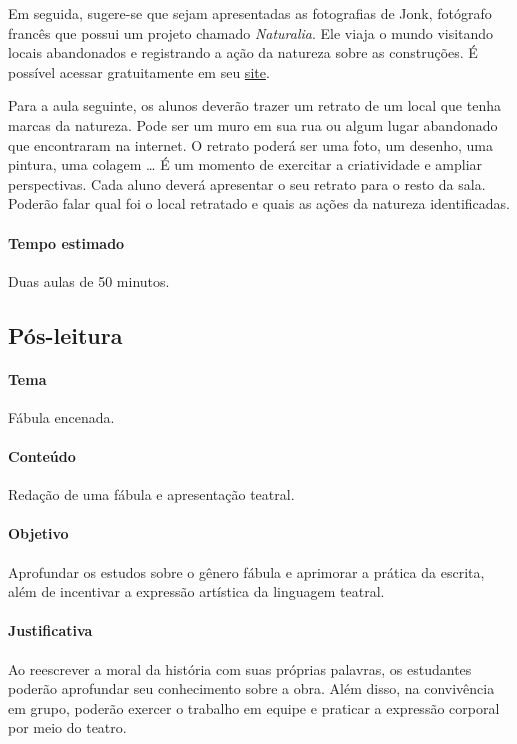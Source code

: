 \documentclass[11pt]{extarticle}
\begin{document}
Em seguida, sugere-se que sejam apresentadas as fotografias de Jonk, fotógrafo francês que possui um projeto chamado \textit{Naturalia}. Ele viaja o mundo visitando locais abandonados e registrando a ação da natureza sobre as construções. É possível acessar gratuitamente em seu \href{https://www.jonk-photography.com/en/naturalia/}{site}.

Para a aula seguinte, os alunos deverão trazer um retrato de um local que tenha marcas da natureza. Pode ser um muro em sua rua ou algum lugar abandonado que encontraram na internet. O retrato poderá ser uma foto, um desenho, uma pintura, uma colagem \ldots{} É um momento de exercitar a criatividade e ampliar perspectivas. Cada aluno deverá apresentar o seu retrato para o resto da sala. Poderão falar qual foi o local retratado e quais as ações da natureza identificadas.

\paragraph{Tempo estimado} Duas aulas de 50 minutos.

\subsection{Pós-leitura}


\paragraph{Tema} Fábula encenada.

\paragraph{Conteúdo} Redação de uma fábula e apresentação teatral.

\paragraph{Objetivo} Aprofundar os estudos sobre o gênero fábula e aprimorar a prática da escrita, além de incentivar a expressão artística da linguagem teatral.

\paragraph{Justificativa} Ao reescrever a moral da história com suas próprias palavras, os estudantes poderão aprofundar seu conhecimento sobre a obra. Além disso, na convivência em grupo, poderão exercer o trabalho em equipe e praticar a expressão corporal por meio do teatro.
\end{document}

